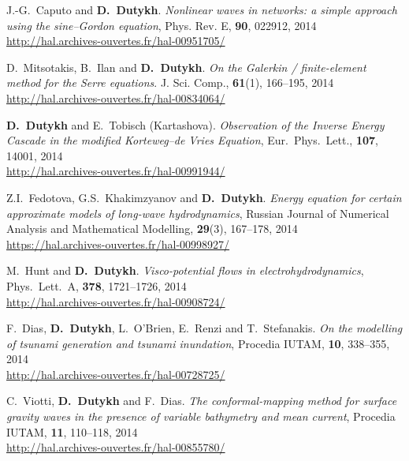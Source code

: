 \begin{etaremune}
  \item J.-G.~Caputo and \textbf{D.~Dutykh}. \textit{Nonlinear waves in networks: a simple approach using the sine--Gordon equation}, Phys. Rev. E, \textbf{90}, 022912, 2014 \\ %
  \url{http://hal.archives-ouvertes.fr/hal-00951705/}
  
  \item D.~Mitsotakis, B.~Ilan and \textbf{D.~Dutykh}. \textit{On the Galerkin / finite-element method for the Serre equations}. J. Sci. Comp., \textbf{61}(1), 166--195, 2014 \\ %
  \url{http://hal.archives-ouvertes.fr/hal-00834064/}
  
  \item \textbf{D.~Dutykh} and E.~Tobisch (Kartashova). \textit{Observation of the Inverse Energy Cascade in the modified Korteweg--de Vries Equation}, Eur.~Phys.~Lett., \textbf{107}, 14001, 2014 \\ %
  \url{http://hal.archives-ouvertes.fr/hal-00991944/}
  
  \item Z.I.~Fedotova, G.S.~Khakimzyanov and \textbf{D.~Dutykh}. \textit{Energy equation for certain approximate models of long-wave hydrodynamics}, Russian Journal of Numerical Analysis and Mathematical Modelling, \textbf{29}(3), 167--178, 2014 \\ %
  \url{https://hal.archives-ouvertes.fr/hal-00998927/}
  
  \item M.~Hunt and \textbf{D.~Dutykh}. \textit{Visco-potential flows in electrohydrodynamics}, Phys.~Lett.~A, \textbf{378}, 1721--1726, 2014 \\ %
  \url{http://hal.archives-ouvertes.fr/hal-00908724/}
  
  \item F.~Dias, \textbf{D.~Dutykh}, L.~O'Brien, E.~Renzi and T.~Stefanakis. \textit{On the modelling of tsunami generation and tsunami inundation}, Procedia IUTAM, \textbf{10}, 338--355, 2014 \\ %
  \url{http://hal.archives-ouvertes.fr/hal-00728725/}
  
  \item C.~Viotti, \textbf{D.~Dutykh} and F.~Dias. \textit{The conformal-mapping method for surface gravity waves in the presence of variable bathymetry and mean current}, Procedia IUTAM, \textbf{11}, 110--118, 2014 \\ %
  \url{http://hal.archives-ouvertes.fr/hal-00855780/}
  

\end{etaremune}
